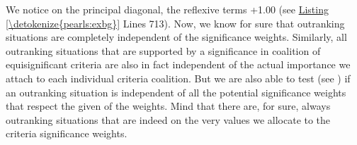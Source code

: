 \documentclass[a4paper,12pt,english]{sphinxhowto}
\begin{document}
\sphinxAtStartPar
We notice on the principal diagonal, the  reflexive terms +1.00 (see \hyperref[\detokenize{pearls:exbg}]{Listing \ref{\detokenize{pearls:exbg}}} Lines 7\sphinxhyphen{}13). Now, we know for sure that  outranking situations are completely independent of the significance weights. Similarly, all outranking situations that are supported by a  significance in  coalition of equi\sphinxhyphen{}significant criteria are also in fact independent of the actual importance we attach to each individual criteria coalition. But we are also able to test (see ) if an outranking situation is independent of all the potential significance weights that respect the given  of the weights. Mind that there are, for sure, always outranking situations that are indeed  on the very values we allocate to the criteria significance weights.
\end{document}
